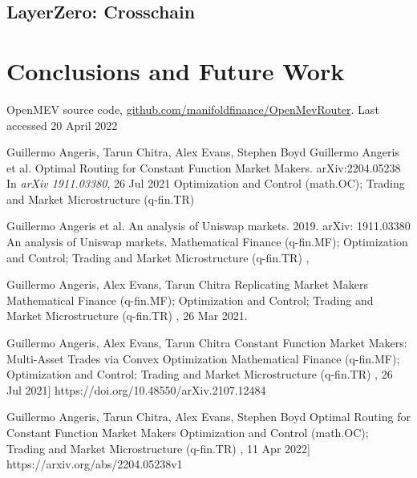 \documentclass[runningheads]{llncs}
\begin{document}
\subsection{LayerZero: Crosschain}

\section{Conclusions and Future Work}

\newpage
%
%
%
% 
% 
%
\begin{thebibliography}{1}
	OpenMEV source code, \url{github.com/manifoldfinance/OpenMevRouter}.
	Last accessed 20 April 2022
	
	\newline
	Guillermo Angeris, Tarun Chitra, Alex Evans, Stephen Boyd
	\newblock Guillermo Angeris et al. Optimal Routing for Constant Function Market Makers.	arXiv:2204.05238
	\newblock In {\em arXiv 1911.03380}, 26 Jul 2021
	Optimization and Control (math.OC); Trading and Market Microstructure (q-fin.TR)

	\hfill \break
	Guillermo Angeris et al. An analysis of Uniswap markets. 2019. arXiv: 1911.03380
	\newblock An analysis of Uniswap markets.
	Mathematical Finance (q-fin.MF); Optimization and Control; Trading and Market Microstructure (q-fin.TR)
	,

	\hfill \break
	Guillermo Angeris, Alex Evans, Tarun Chitra
	\newblock Replicating Market Makers
	Mathematical Finance (q-fin.MF); Optimization and Control; Trading and Market Microstructure (q-fin.TR)
	, 26 Mar 2021.

	\hfill \break
	Guillermo Angeris, Alex Evans, Tarun Chitra
	\newblock Constant Function Market Makers: Multi-Asset Trades via Convex Optimization
	Mathematical Finance (q-fin.MF); Optimization and Control; Trading and Market Microstructure (q-fin.TR)
	, 26 Jul 2021]
	https://doi.org/10.48550/arXiv.2107.12484

	\hfill \break
	Guillermo Angeris, Tarun Chitra, Alex Evans, Stephen Boyd
	\newblock Optimal Routing for Constant Function Market Makers
	Optimization and Control (math.OC); Trading and Market Microstructure (q-fin.TR)
	, 11 Apr 2022]
	https://arxiv.org/abs/2204.05238v1
	\hfill \break

\end{thebibliography}
\end{document}
